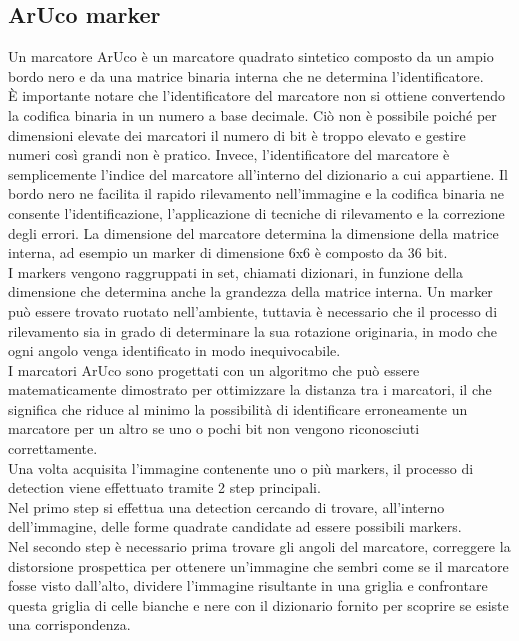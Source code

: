 \label{sec:prem_teo}
\subsection{ArUco marker}
Un marcatore ArUco \cite{ArUco} è un marcatore quadrato sintetico composto da un ampio bordo nero e da una matrice binaria interna che ne determina l'identificatore.\\ 
\`E importante notare che l'identificatore del marcatore non si ottiene convertendo la codifica binaria in un numero a base decimale. Ciò non è possibile poiché per dimensioni elevate dei marcatori il numero di bit è troppo elevato e gestire numeri così grandi non è pratico. Invece, l'identificatore del marcatore è semplicemente l'indice del marcatore all'interno del dizionario a cui appartiene.
Il bordo nero ne facilita il rapido rilevamento nell'immagine e la codifica binaria ne consente l'identificazione, l'applicazione di tecniche di rilevamento e la correzione degli errori. La dimensione del marcatore determina la dimensione della matrice interna, ad esempio un marker di dimensione 6x6 è composto da 36 bit.\\
I markers vengono raggruppati in set, chiamati dizionari, in funzione della dimensione che determina anche la grandezza della matrice interna. 
Un marker può essere trovato ruotato nell'ambiente, tuttavia è necessario che il processo di rilevamento sia in grado di determinare la sua rotazione originaria, in modo che ogni angolo venga identificato in modo inequivocabile.\\
I marcatori ArUco sono progettati con un algoritmo che può essere matematicamente dimostrato per ottimizzare la distanza tra i marcatori, il che significa che riduce al minimo la possibilità di identificare erroneamente un marcatore per un altro se uno o pochi bit non vengono riconosciuti correttamente.\\
Una volta acquisita l’immagine contenente uno o più markers, il processo di detection viene effettuato tramite 2 step principali. \\
Nel primo step si effettua una detection cercando di trovare, all’interno dell’immagine, delle forme quadrate candidate ad essere possibili markers.\\ 
Nel secondo step è necessario prima trovare gli angoli del marcatore, correggere la distorsione prospettica per ottenere un'immagine che sembri come se il marcatore fosse visto dall'alto, dividere l'immagine risultante in una griglia e confrontare questa griglia di celle bianche e nere con il dizionario fornito per scoprire se esiste una corrispondenza.
